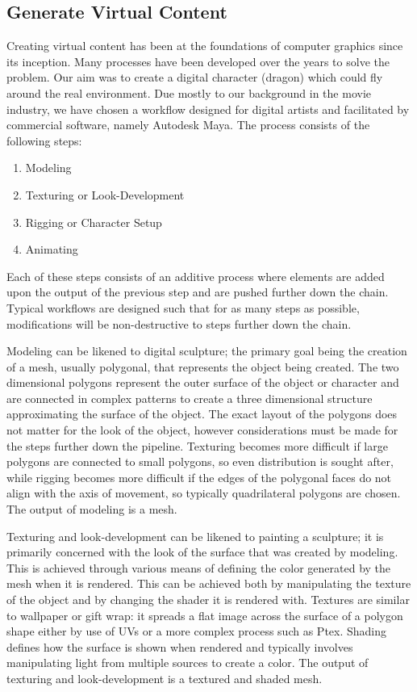 \subsection{Generate Virtual Content}

Creating virtual content has been at the foundations of computer graphics since its inception. Many processes have been developed over the years to solve the problem. Our aim was to create a digital character (dragon) which could fly around the real environment. Due mostly to our background in the movie industry, we have chosen a workflow designed for digital artists and facilitated by commercial software, namely Autodesk Maya. The process consists of the following steps:

\begin{enumerate}
	\item Modeling 
	\item Texturing or Look-Development
	\item Rigging or Character Setup
	\item Animating
\end{enumerate}

Each of these steps consists of an additive process where elements are added upon the output of the previous step and are pushed further down the chain. Typical workflows are designed such that for as many steps as possible, modifications will be non-destructive to steps further down the chain.

Modeling can be likened to digital sculpture; the primary goal being the creation of a mesh, usually polygonal, that represents the object being created. The two dimensional polygons represent the outer surface of the object or character and are connected in complex patterns to create a three dimensional structure approximating the surface of the object. The exact layout of the polygons does not matter for the look of the object, however considerations must be made for the steps further down the pipeline. Texturing becomes more difficult if large polygons are connected to small polygons, so even distribution is sought after, while rigging becomes more difficult if the edges of the polygonal faces do not align with the axis of movement, so typically quadrilateral polygons are chosen. The output of modeling is a mesh.

Texturing and look-development can be likened to painting a sculpture; it is primarily concerned with the look of the surface that was created by modeling. This is achieved through various means of defining the color generated by the mesh when it is rendered. This can be achieved both by manipulating the texture of the object and by changing the shader it is rendered with. Textures are similar to wallpaper or gift wrap: it spreads a flat image across the surface of a polygon shape either by use of UVs\cite{catmull1974subdivision} or a more complex process such as Ptex. Shading defines how the surface is shown when rendered and typically involves manipulating light from multiple sources to create a color. The output of texturing and look-development is a textured and shaded mesh. 

